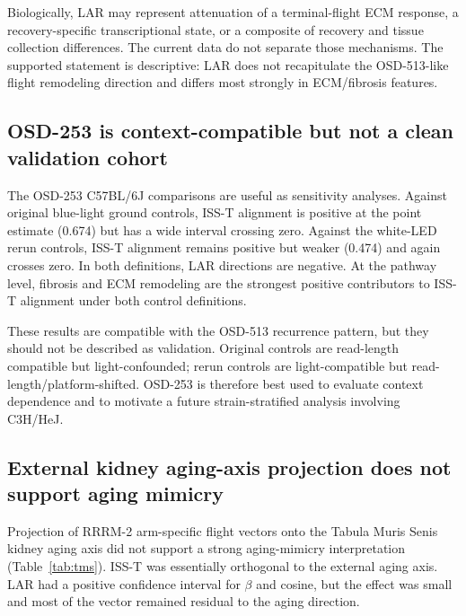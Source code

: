 \documentclass[11pt]{article}
\begin{document}
Biologically, LAR may represent attenuation of a terminal-flight ECM response, a recovery-specific transcriptional state, or a composite of recovery and tissue collection differences. The current data do not separate those mechanisms. The supported statement is descriptive: LAR does not recapitulate the OSD-513-like flight remodeling direction and differs most strongly in ECM/fibrosis features.

\subsection{OSD-253 is context-compatible but not a clean validation cohort}

The OSD-253 C57BL/6J comparisons are useful as sensitivity analyses. Against original blue-light ground controls, ISS-T alignment is positive at the point estimate (0.674) but has a wide interval crossing zero. Against the white-LED rerun controls, ISS-T alignment remains positive but weaker (0.474) and again crosses zero. In both definitions, LAR directions are negative. At the pathway level, fibrosis and ECM remodeling are the strongest positive contributors to ISS-T alignment under both control definitions.

These results are compatible with the OSD-513 recurrence pattern, but they should not be described as validation. Original controls are read-length compatible but light-confounded; rerun controls are light-compatible but read-length/platform-shifted. OSD-253 is therefore best used to evaluate context dependence and to motivate a future strain-stratified analysis involving C3H/HeJ.

\subsection{External kidney aging-axis projection does not support aging mimicry}

Projection of RRRM-2 arm-specific flight vectors onto the Tabula Muris Senis kidney aging axis did not support a strong aging-mimicry interpretation (Table~\ref{tab:tms}). ISS-T was essentially orthogonal to the external aging axis. LAR had a positive confidence interval for $\beta$ and cosine, but the effect was small and most of the vector remained residual to the aging direction.
\end{document}
